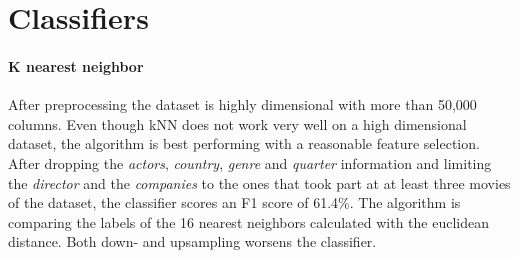 
\section {Classifiers}
\paragraph{K nearest neighbor}
After preprocessing the dataset is highly dimensional with more than 50,000 columns. Even though kNN does not work very well on a high dimensional dataset, the algorithm is best performing with a reasonable feature selection. After dropping the \textit{actors}, \textit{country}, \textit{genre} and \textit{quarter} information and limiting the \textit{director} and the \textit{companies} to the ones that took part at at least three movies of the dataset, the classifier scores an F1 score of 61.4\%. The algorithm is comparing the labels of the 16 nearest neighbors calculated with the euclidean distance. Both down- and upsampling worsens the classifier. 

